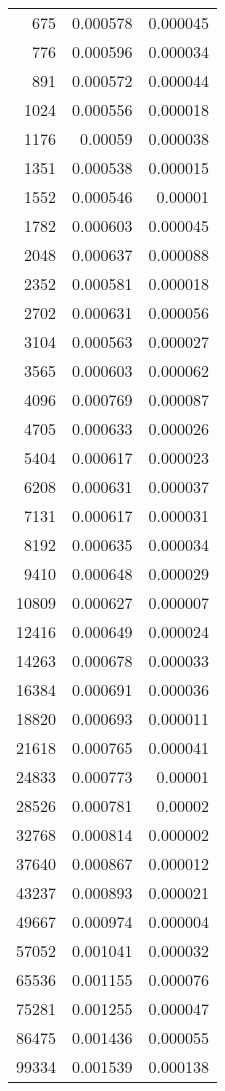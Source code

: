 \begin{longtable}{r r r}
675 & 0.000578 & 0.000045 \\
776 & 0.000596 & 0.000034 \\
891 & 0.000572 & 0.000044 \\
1024 & 0.000556 & 0.000018 \\
1176 & 0.00059 & 0.000038 \\
1351 & 0.000538 & 0.000015 \\
1552 & 0.000546 & 0.00001 \\
1782 & 0.000603 & 0.000045 \\
2048 & 0.000637 & 0.000088 \\
2352 & 0.000581 & 0.000018 \\
2702 & 0.000631 & 0.000056 \\
3104 & 0.000563 & 0.000027 \\
3565 & 0.000603 & 0.000062 \\
4096 & 0.000769 & 0.000087 \\
4705 & 0.000633 & 0.000026 \\
5404 & 0.000617 & 0.000023 \\
6208 & 0.000631 & 0.000037 \\
7131 & 0.000617 & 0.000031 \\
8192 & 0.000635 & 0.000034 \\
9410 & 0.000648 & 0.000029 \\
10809 & 0.000627 & 0.000007 \\
12416 & 0.000649 & 0.000024 \\
14263 & 0.000678 & 0.000033 \\
16384 & 0.000691 & 0.000036 \\
18820 & 0.000693 & 0.000011 \\
21618 & 0.000765 & 0.000041 \\
24833 & 0.000773 & 0.00001 \\
28526 & 0.000781 & 0.00002 \\
32768 & 0.000814 & 0.000002 \\
37640 & 0.000867 & 0.000012 \\
43237 & 0.000893 & 0.000021 \\
49667 & 0.000974 & 0.000004 \\
57052 & 0.001041 & 0.000032 \\
65536 & 0.001155 & 0.000076 \\
75281 & 0.001255 & 0.000047 \\
86475 & 0.001436 & 0.000055 \\
99334 & 0.001539 & 0.000138 \\

\end{longtable}
